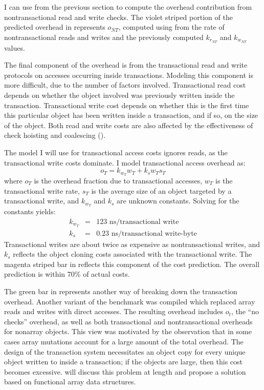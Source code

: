 I can use  from the previous section to compute the
overhead contribution from nontransactional read and write checks.
The violet striped portion of the predicted overhead in
 represents $o_{NT}$, computed using
 from the rate of nontransactional reads and writes
and the previously computed $k_{r_{NT}}$ and $k_{w_{NT}}$ values.

The final component of the overhead is from the transactional read and
write protocols on accesses occurring inside transactions.
Modeling this component is more difficult, due to the number of
factors involved.  Transactional read cost depends on whether the
object involved was previously written inside the transaction.
Transactional write cost depends on whether this is
the first time this particular object has been written inside a
transaction, and if so, on the size of the object.  Both read and
write costs are also affected by the effectiveness of check hoisting
and coalescing ().

The model I will use for transactional access costs ignores reads, as
the transactional write costs dominate.  I model transactional access
overhead as:
\begin{equation}
o_T = k_{w_T} w_T + k_s w_T s_T
\end{equation}
where $o_{T}$ is the overhead fraction due to transactional accesses,
$w_T$ is the transactional write rate, $s_T$ is the average size of an
object targeted by a transactional write, and $k_{w_T}$ and $k_s$ are
unknown constants.  Solving for the constants yields:
\begin{eqnarray*}
 k_{w_T} &=& 123 \text{ ns}/\text{transactional write}\\
 k_s &=& 0.23 \text{ ns}/\text{transactional write-byte}
\end{eqnarray*}
Transactional writes are about twice as expensive as nontransactional
writes, and $k_s$ reflects the object cloning costs associated with
the transactional write.  The magenta striped bar in
 reflects this component of the cost prediction.
The overall prediction is within 70\% of actual costs.

The green bar in  represents another way of
breaking down the transaction overhead.  Another variant of the
benchmark was compiled which replaced array reads and writes with
direct accesses.  The resulting overhead includes $o_t$, the ``no
checks'' overhead, as well as both transactional and
nontransactional overheads for nonarray objects.  This view was
motivated by the observation that in some cases array mutations
account for a large amount of the total overhead.
  The design of the \apex transaction system necessitates an
object copy for every unique object written to inside a transaction;
if the objects are large, then this cost becomes excessive.
 will discuss this problem at
length and propose a solution based on functional array data
structures.

